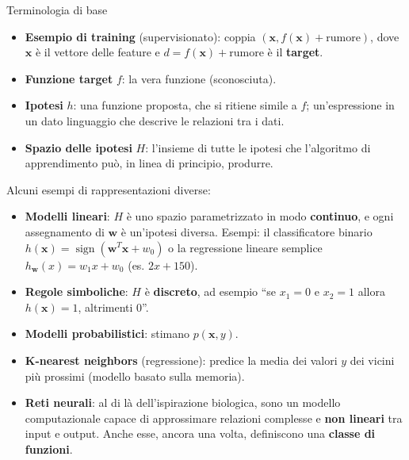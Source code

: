 \begin{boxdefinition}{Terminologia di base}

\begin{itemize}
\tightlist
\item
  \textbf{Esempio di training} (supervisionato): coppia
  \((\mathbf{x}, f(\mathbf{x}) + \text{rumore})\), dove \(\mathbf{x}\) è
  il vettore delle feature e \(d = f(\mathbf{x}) + \text{rumore}\) è il
  \textbf{target}.
\item
  \textbf{Funzione target} \(f\): la vera funzione (sconosciuta).
\item
  \textbf{Ipotesi} \(h\): una funzione proposta, che si ritiene simile a
  \(f\); un'espressione in un dato linguaggio che descrive le relazioni
  tra i dati.
\item
  \textbf{Spazio delle ipotesi} \(H\): l'insieme di tutte le ipotesi che
  l'algoritmo di apprendimento può, in linea di principio, produrre.
\end{itemize}

\end{boxdefinition}

Alcuni esempi di rappresentazioni diverse:

\begin{itemize}
\tightlist
\item
  \textbf{Modelli lineari}: \(H\) è uno spazio parametrizzato in modo
  \textbf{continuo}, e ogni assegnamento di \(\mathbf{w}\) è un'ipotesi
  diversa. Esempi: il classificatore binario
  \(h(\mathbf{x}) = \operatorname{sign}(\mathbf{w}^T\mathbf{x} + w_0)\)
  o la regressione lineare semplice \(h_\mathbf{w}(x) = w_1 x + w_0\)
  (es. \(2x + 150\)).
\item
  \textbf{Regole simboliche}: \(H\) è \textbf{discreto}, ad esempio ``se
  \(x_1 = 0\) e \(x_2 = 1\) allora \(h(\mathbf{x}) = 1\), altrimenti
  \(0\)''.
\item
  \textbf{Modelli probabilistici}: stimano \(p(\mathbf{x}, y)\).
\item
  \textbf{K-nearest neighbors} (regressione): predice la media dei
  valori \(y\) dei vicini più prossimi (modello basato sulla memoria).
\item
  \textbf{Reti neurali}: al di là dell'ispirazione biologica, sono un
  modello computazionale capace di approssimare relazioni complesse e
  \textbf{non lineari} tra input e output. Anche esse, ancora una volta,
  definiscono una \textbf{classe di funzioni}.
\end{itemize}

